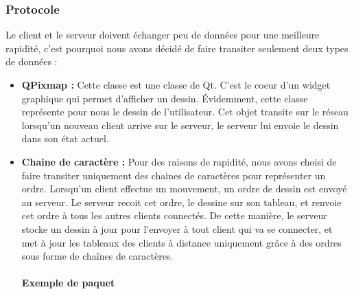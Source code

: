 \documentclass{report}
\begin{document}
			\subsubsection{Protocole}
				Le client et le serveur doivent échanger peu de données pour une meilleure rapidité, c'est pourquoi nous avons décidé de faire transiter seulement deux types de données : 
				\begin{itemize}
					\item \textbf{QPixmap : } Cette classe est une classe de Qt. C'est le coeur d'un widget graphique qui permet d'afficher un dessin. Évidemment, cette classe représente pour nous le dessin de l'utilisateur. Cet objet transite sur le réseau lorsqu'un nouveau client arrive sur le serveur, le serveur lui envoie le dessin dans son état actuel.
					\item \textbf{Chaine de caractère : } Pour des raisons de rapidité, nous avons choisi de faire transiter uniquement des chaines de caractères pour représenter un ordre. Lorsqu'un client effectue un mouvement, un ordre de dessin est envoyé au serveur. Le serveur recoit cet ordre, le dessine sur son tableau, et renvoie cet ordre à tous les autres clients connectés. De cette manière, le serveur stocke un dessin à jour pour l'envoyer à tout client qui va se connecter, et met à jour les tableaux des clients à distance uniquement grâce à des ordres sous forme de chaînes de caractères.
					
				\paragraph{Exemple de paquet}
				

\end{itemize}
\end{document}
